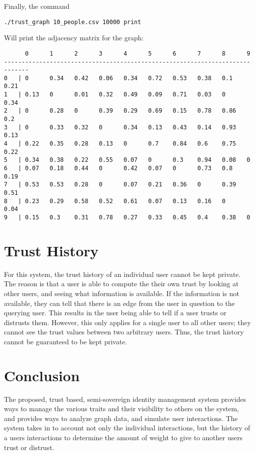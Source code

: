 \documentclass{article}
\begin{document}
Finally, the command 
\begin{verbatim}
./trust_graph 10_people.csv 10000 print
\end{verbatim}
Will print the adjacency matrix for the graph: 
\begin{verbatim}
      0      1      2      3      4      5      6      7      8      9      
-----------------------------------------------------------------------------
0   | 0      0.34   0.42   0.06   0.34   0.72   0.53   0.38   0.1    0.21   
1   | 0.13   0      0.01   0.32   0.49   0.09   0.71   0.03   0      0.34   
2   | 0      0.28   0      0.39   0.29   0.69   0.15   0.78   0.86   0.2    
3   | 0      0.33   0.32   0      0.34   0.13   0.43   0.14   0.93   0.13   
4   | 0.22   0.35   0.28   0.13   0      0.7    0.84   0.6    0.75   0.22   
5   | 0.34   0.38   0.22   0.55   0.07   0      0.3    0.94   0.08   0      
6   | 0.07   0.18   0.44   0      0.42   0.07   0      0.73   0.8    0.19   
7   | 0.53   0.53   0.28   0      0.07   0.21   0.36   0      0.39   0.51   
8   | 0.23   0.29   0.58   0.52   0.61   0.07   0.13   0.16   0      0.04   
9   | 0.15   0.3    0.31   0.78   0.27   0.33   0.45   0.4    0.38   0      
\end{verbatim}

\section{Trust History}
For this system, the trust history of an individual user cannot be kept private. The
reason is that a user is able to compute the their own trust by looking at other 
users, and seeing what information is available. If the information is not available, 
they can tell that there is an edge from the user in question to the querying user. 
This results in the user being able to tell if a user trusts or distrusts them. 
However, this only applies for a single user to all other users; they cannot see
the trust values between two arbitrary users. Thus, the trust history cannot be
guaranteed to be kept private. 

\section{Conclusion}
The proposed, trust based, semi-sovereign identity management system provides ways to
manage the various traits and their visibility to others on the system, and provides
ways to analyze graph data, and simulate user interactions. The system takes in to 
account not only the individual interactions, but the history of a users interactions
to determine the amount of weight to give to another users trust or distrust. 
\end{document}
